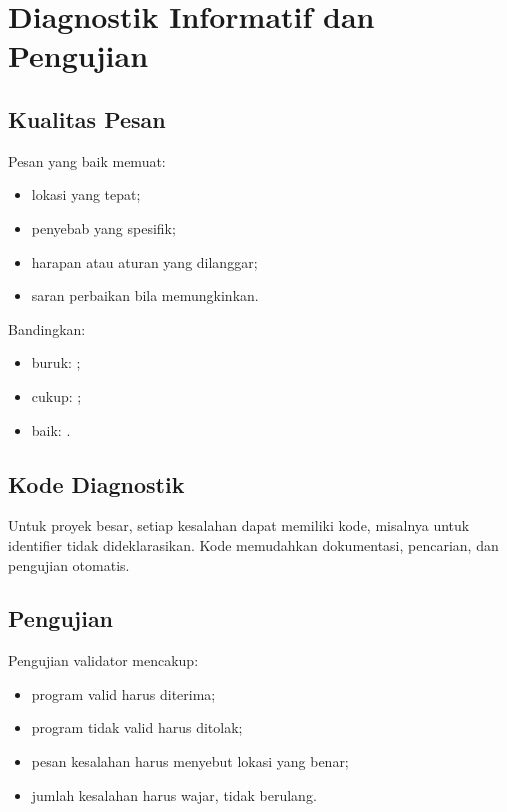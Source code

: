 \section{Diagnostik Informatif dan Pengujian}
\label{sec:ch16-diagnostik}

\subsection{Kualitas Pesan}

Pesan yang baik memuat:
\begin{itemize}[leftmargin=*]
  \item lokasi yang tepat;
  \item penyebab yang spesifik;
  \item harapan atau aturan yang dilanggar;
  \item saran perbaikan bila memungkinkan.
\end{itemize}

Bandingkan:
\begin{itemize}[leftmargin=*]
  \item buruk: ;
  \item cukup: ;
  \item baik: .
\end{itemize}

\subsection{Kode Diagnostik}

Untuk proyek besar, setiap kesalahan dapat memiliki kode, misalnya
 untuk identifier tidak dideklarasikan. Kode memudahkan
dokumentasi, pencarian, dan pengujian otomatis.

\subsection{Pengujian}

Pengujian validator mencakup:
\begin{itemize}[leftmargin=*]
  \item program valid harus diterima;
  \item program tidak valid harus ditolak;
  \item pesan kesalahan harus menyebut lokasi yang benar;
  \item jumlah kesalahan harus wajar, tidak berulang.
\end{itemize}

